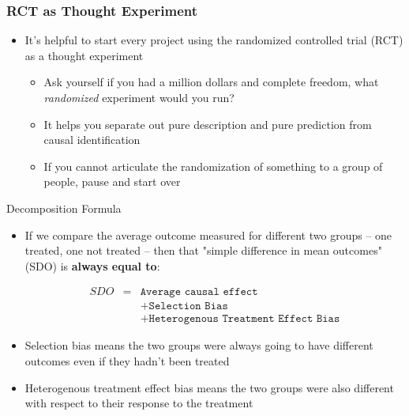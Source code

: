 \documentclass{beamer}
\begin{document}
\begin{frame}
\frametitle{RCT as Thought Experiment}
\begin{itemize}
\item It's helpful to start every project using the randomized controlled trial (RCT) as a thought experiment
	\begin{itemize}
	\item Ask yourself if you had a million dollars and complete freedom, what \emph{randomized} experiment would you run?
	\item It helps you separate out pure description and pure prediction from causal identification
	\item If you cannot articulate the randomization of something to a group of people, pause and start over
	\end{itemize}
\end{itemize}

\end{frame}

\begin{frame}{Decomposition Formula}

\begin{itemize}
\item If we compare the average outcome measured for different two groups -- one treated, one not treated -- then that "simple difference in mean outcomes" (SDO) is \textbf{always equal to}:

\begin{eqnarray*}
SDO &=& \texttt{Average causal effect}  \\
&&+ \texttt{Selection Bias} \\
&&+ \texttt{Heterogenous Treatment Effect Bias}
\end{eqnarray*}
\item Selection bias means the two groups were always going to have different outcomes even if they hadn't been treated
\item Heterogenous treatment effect bias means the two groups were also different with respect to their response to the treatment
\end{itemize}

\end{frame}
\end{document}
